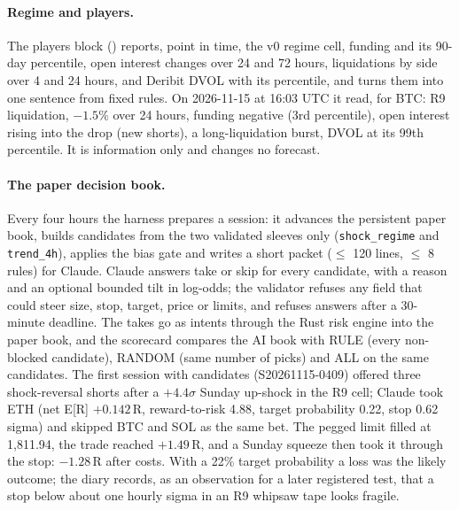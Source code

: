 \documentclass[10pt,a4paper]{article}
\begin{document}
\paragraph{Regime and players.} The players block (\protect{}) reports, point in time, the v0 regime cell, funding and its 90-day percentile, open interest changes over 24 and 72 hours, liquidations by side over 4 and 24 hours, and Deribit DVOL with its percentile, and turns them into one sentence from fixed rules. On 2026-11-15 at 16:03 UTC it read, for BTC: R9 liquidation, $-1.5\%$ over 24 hours, funding negative (3rd percentile), open interest rising into the drop (new shorts), a long-liquidation burst, DVOL at its 99th percentile. It is information only and changes no forecast.

\paragraph{The paper decision book.} Every four hours the harness prepares a session: it advances the persistent paper book, builds candidates from the two validated sleeves only (\texttt{shock\_regime} and \texttt{trend\_4h}), applies the bias gate and writes a short packet ($\le$ 120 lines, $\le$ 8 rules) for Claude. Claude answers take or skip for every candidate, with a reason and an optional bounded tilt in log-odds; the validator refuses any field that could steer size, stop, target, price or limits, and refuses answers after a 30-minute deadline. The takes go as intents through the Rust risk engine into the paper book, and the scorecard compares the AI book with RULE (every non-blocked candidate), RANDOM (same number of picks) and ALL on the same candidates. The first session with candidates (S20261115-0409) offered three shock-reversal shorts after a $+4.4\sigma$ Sunday up-shock in the R9 cell; Claude took ETH (net E[R] $+0.142$\,R, reward-to-risk 4.88, target probability 0.22, stop 0.62 sigma) and skipped BTC and SOL as the same bet. The pegged limit filled at 1,811.94, the trade reached $+1.49$\,R, and a Sunday squeeze then took it through the stop: $-1.28$\,R after costs. With a 22\% target probability a loss was the likely outcome; the diary records, as an observation for a later registered test, that a stop below about one hourly sigma in an R9 whipsaw tape looks fragile.
\end{document}
